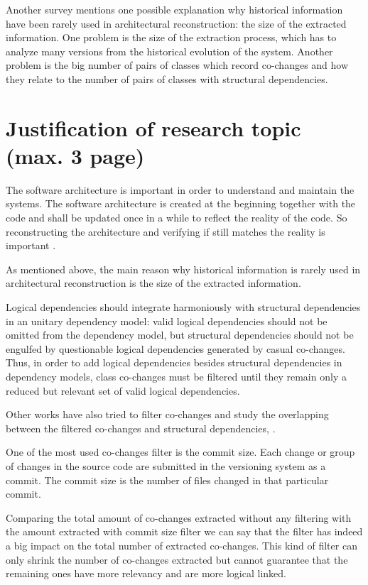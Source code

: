 \documentclass[12pt,a4paper,oneside]{report}
\begin{document}
Another survey \cite{Shtern:2012:CMS:2332427.2332428} mentions one possible explanation why historical information have been rarely used in architectural reconstruction: the size of the extracted information. One problem is the size of the extraction process, which has to analyze many versions from the historical evolution of the system. Another problem is the big number of pairs of classes which record co-changes and how they relate to the number of pairs of classes with structural dependencies.


{\let\clearpage\relax \chapter{Justification of research topic (max. 3 page)}}
The software architecture is important in order to understand and maintain the systems. The software architecture is created at the beginning together with the code and shall be updated once in a while to reflect the reality of the code. So reconstructing the architecture and verifying if still matches the reality is important \cite{sar}. 

As  mentioned above, the main reason why historical information is rarely used in architectural reconstruction is the size of the extracted information. 

Logical dependencies should integrate harmoniously with structural dependencies in an unitary dependency model: valid logical dependencies should not be omitted from the dependency model, but structural dependencies should not be engulfed by questionable logical dependencies generated by casual co-changes.  
Thus, in order to add logical dependencies besides structural dependencies in dependency models, class co-changes must be filtered until they remain only a reduced but relevant set of valid logical dependencies. 

Other works have also tried to filter co-changes and study the overlapping between the filtered co-changes and structural dependencies\cite{Oliva:2011:ISL:2067853.2068086}, \cite{DBLP:journals/jss/AjienkaC17}.

One of the most used co-changes filter is the commit size. Each change or group of changes in the source code are submitted in the versioning system as a commit. The commit size is the number of files changed in that particular commit.

Comparing the total amount of co-changes extracted without any filtering with the amount extracted with commit size filter we can say that the filter has indeed a big impact on the total number of extracted co-changes. This kind of filter can only shrink the number of co-changes extracted but cannot guarantee that the remaining ones have more relevancy and are more logical linked.
\end{document}
